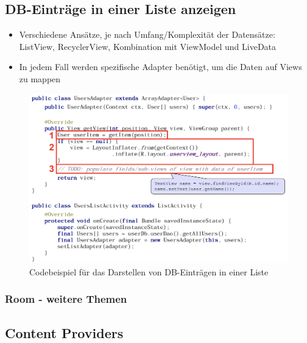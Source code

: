 \documentclass[a4paper]{article}
\begin{document}
\newpage

\subsection{DB-Einträge in einer Liste anzeigen}

\begin{itemize}
	\item Verschiedene Ansätze, je nach Umfang/Komplexität der Datensätze:\\
	ListView, RecyclerView, Kombination mit ViewModel und LiveData
	\item In jedem Fall werden spezifische Adapter benötigt, um die Daten auf Views zu mappen
\end{itemize}

\begin{figure}[htb!]
	\centering
	\includegraphics[width=\textwidth]{img/dbentries_list.png}
	\caption{Codebeispiel für das Darstellen von DB-Einträgen in einer Liste}
\end{figure}


\subsubsection{Room - weitere Themen}


\newpage

\subsection{Content Providers}
\end{document}
